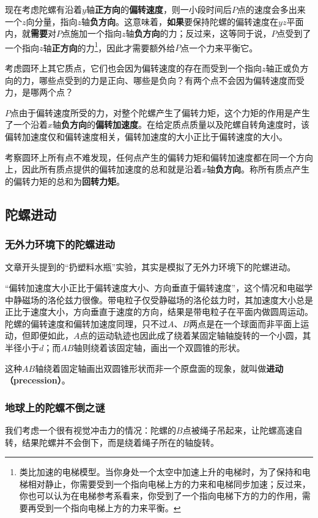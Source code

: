 现在考虑陀螺有沿着$y$轴\textbf{正方向}的\textbf{偏转速度}，则一小段时间后$P$点的速度会多出来一个$z$向分量，指向$z$轴\textbf{负方向}。这意味着，\textbf{如果}要保持陀螺的偏转速度在$yz$平面内，就\textbf{需要}对$P$点施加一个指向$z$轴\textbf{负方向}的力；反过来，这等同于说，$P$点受到了一个指向$z$轴\textbf{正方向}的力\footnote{类比加速的电梯模型。当你身处一个太空中加速上升的电梯时，为了保持和电梯相对静止，你需要受到一个指向电梯上方的力来和电梯同步加速；反过来，你也可以认为在电梯参考系看来，你受到了一个指向电梯下方的力的作用，需要再受到一个指向电梯上方的力来平衡。}，因此才需要额外给$P$点一个力来平衡它。

\begin{exercise}{}
考虑圆环上其它质点，它们也会因为偏转速度的存在而受到一个指向$z$轴正或负方向的力，哪些点受到的力是正向、哪些是负向？有两个点不会因为偏转速度而受力，是哪两个点？
\end{exercise}


$P$点由于偏转速度所受的力，对整个陀螺产生了偏转力矩，这个力矩的作用是产生了一个沿着$x$轴\textbf{负方向}的\textbf{偏转加速度}。在给定质点质量以及陀螺自转角速度时，该偏转加速度仅和偏转速度相关，偏转加速度的大小正比于偏转速度的大小。

考察圆环上所有点不难发现，任何点产生的偏转力矩和偏转加速度都在同一个方向上，因此所有质点提供的偏转加速度的总和就是沿着$x$轴\textbf{负方向}。称所有质点产生的偏转力矩的总和为\textbf{回转力矩}。










\subsection{陀螺进动}


\subsubsection{无外力环境下的陀螺进动}


文章开头提到的“扔塑料水瓶”实验，其实是模拟了无外力环境下的陀螺进动。


“偏转加速度大小正比于偏转速度大小、方向垂直于偏转速度”，这个情况和电磁学中静磁场的洛伦兹力很像。带电粒子仅受静磁场的洛伦兹力时，其加速度大小总是正比于速度大小，方向垂直于速度的方向，结果是带电粒子在平面内做圆周运动。陀螺的偏转速度和偏转加速度同理，只不过$A$、$B$两点是在一个球面而非平面上运动，但即便如此，$A$点的运动轨迹也因此成了绕着某固定轴轴旋转的一个小圆，其半径小于$d$；而$AB$轴则绕着该固定轴，画出一个双圆锥的形状。


这种$AB$轴绕着固定轴画出双圆锥形状而非一个原盘面的现象，就叫做\textbf{进动（precession）}。





\subsubsection{地球上的陀螺不倒之谜}



我们考虑一个很有视觉冲击力的情况：陀螺的$B$点被绳子吊起来，让陀螺高速自转，结果陀螺并不会倒下，而是绕着绳子所在的轴旋转。














